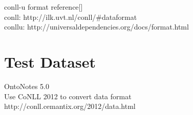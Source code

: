 \documentclass[letterpaper]{article}
\begin{document}
\begin{appendices}
conll-u format reference[] \\

conll:   http://ilk.uvt.nl/conll/\#dataformat\\
conllu:  http://universaldependencies.org/docs/format.html\\

\section{Test Dataset}
OntoNotes 5.0\\
Use CoNLL 2012 to convert data format\\
http://conll.cemantix.org/2012/data.html\\



\end{appendices}
\end{document}
